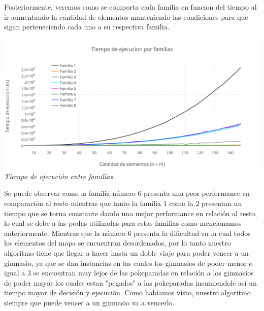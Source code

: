 Posteriormente, veremos como se comporta cada familia en funcion del tiempo al ir aumentando la cantidad de elementos manteniendo las condiciones para que sigan perteneciendo cada uno a su respectiva familia.

\vspace*{0.3cm} \vspace*{0.3cm}
  \begin{center}
\includegraphics[scale=0.60]{./EJ2/comparativo.png}
\\{\textit{Tiempo de ejecución entre familias}}
  \end{center}
  \vspace*{0.3cm}
  \begin{figure} [!ht]
 \centering
       \label{fig:jaggies}
    \label{fig:moire}
    \end{figure}
  
Se puede observar como la familia n\'umero 6 presenta una peor performance en comparaci\'on al resto mientras que tanto la familia 1 como la 2 presentan un tiempo que se torna constante dando una mejor performance en relaci\'on al resto, lo cual se debe a las podas utilizadas para estas familias como mencionamos anteriormente. Mientras que la n\'umero 6 presenta la dificultad en la cual todos los elementos del mapa se encuentran desordenados, por lo tanto nuestro algoritmo tiene que llegar a hacer hasta un doble viaje para poder vencer a un gimnasio, ya que se dan instancias en las cuales los gimnasios de poder menor o igual a 3 se encuentran muy lejos de las pokeparadas en relaci\'on a los gimnasios de poder mayor los cuales estan "pegados" a las pokeparadas insumiendole as\'i un tiempo mayor de decisi\'on y ejecuci\'on. Como hab\'iamos visto, nuestro algoritmo siempre que puede vencer a un gimnasio va a vencerlo.

